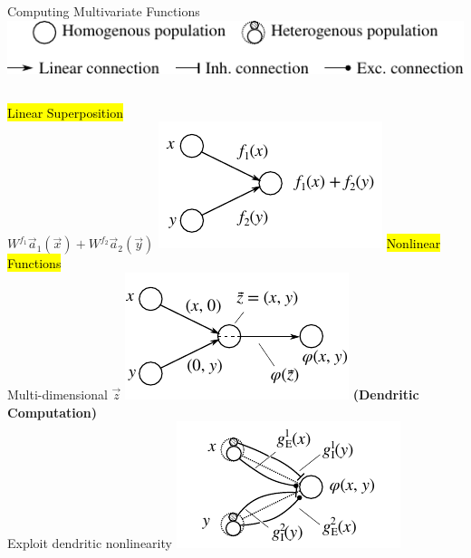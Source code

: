 \documentclass[handout,aspectratio=169]{beamer}
\begin{document}
	\begin{frame}{Computing Multivariate Functions}
		\centering
		\includegraphics{media/network_legend_3.pdf}\\[0.5cm]
		\begin{columns}[t]
			\centering
			\hl{Linear Superposition}\\[0.25cm]
			$W^{f_1} \vec a_1(\vec x) + W^{f_2} \vec a_2 (\vec y)$
			\includegraphics{media/network_a.pdf}
			\pause
			\centering
			\hl{Nonlinear Functions}\\[0.25cm]
			Multi-dimensional $\vec z$
			\includegraphics{media/network_c.pdf}
			\pause
			\centering
			\textbf{(Dendritic Computation)}\\[0.25cm]
			Exploit dendritic nonlinearity
			\includegraphics{media/network_d.pdf}
		\end{columns}
	\end{frame}
\end{document}
